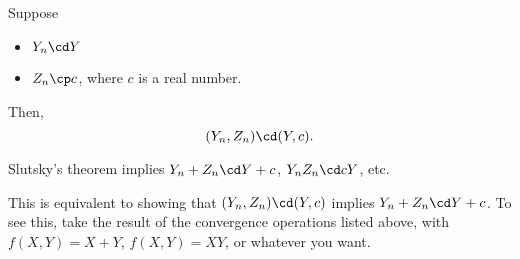 \begin{theorem}

Suppose 
\begin{itemize}
    \setlength \itemsep{0cm}
    \item $Y_n\cd Y$
    \item $Z_n\cp c$, where $c$ is a real number.
\end{itemize}
Then, 
\[(Y_n, Z_n)\cd (Y,c).\]
\end{theorem}

\begin{example}
\exlabel

Slutsky's theorem implies $Y_n+Z_n\cd Y+c$, $Y_nZ_n\cd cY$, etc. 
\end{example}

This is equivalent to showing that $(Y_n, Z_n)\cd (Y,c)$ implies $Y_n+Z_n\cd Y+c$. To see this, take the result of the convergence operations listed above, with $f(X,Y) = X+Y$, $f(X,Y) = XY$, or whatever you want.  